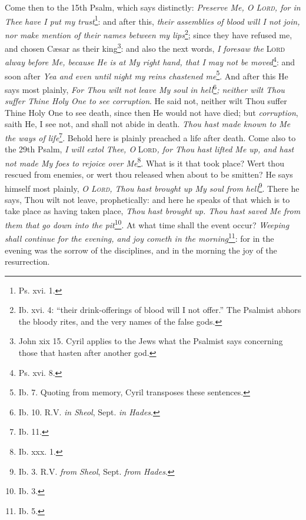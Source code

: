 Come then to the 15th Psalm, which says distinctly: \emph{Preserve Me, \textsc{O Lord}, for in Thee} \emph{have I put my trust}\footnote{Ps. xvi. 1.}: and after this, \emph{their assemblies of blood will I not join, nor make mention of their names between my lips}\footnote{Ib. xvi. 4: “their drink-offerings of blood will I not offer.” The Psalmist abhors the bloody rites, and the very names of the false gods.}; since they have refused me, and chosen Cæsar as their king\footnote{John xix 15. Cyril applies to the Jews what the Psalmist says concerning those that hasten after another god.}: and also the next words, \emph{I foresaw the} \textsc{Lord} \emph{alway before Me, because He is at My right hand, that I may not be moved}\footnote{Ps. xvi. 8.}: and soon after \emph{Yea and even until night my reins chastened me}\footnote{Ib. 7. Quoting from memory, Cyril transposes these sentences.}. And after this He says most plainly, \emph{For Thou wilt not leave My soul in hell}\footnote{Ib. 10. R.V. \emph{in Sheol}, Sept. \emph{in Hades}.}\emph{; neither wilt Thou suffer Thine Holy One to see corruption}. He said not, neither wilt Thou suffer Thine Holy One to see death, since then He would not have died; but \emph{corruption}, saith He, I see not, and shall not abide in death. \emph{Thou hast made known to Me the ways of life}\footnote{Ib. 11.}. Behold here is plainly preached a life after death. Come also to the 29th Psalm, \emph{I will extol Thee, O} \textsc{Lord}\emph{, for Thou hast lifted Me up, and hast not made My foes to rejoice over Me}\footnote{Ib. xxx. 1.}. What is it that took place? Wert thou rescued from enemies, or wert thou released when about to be smitten? He says himself most plainly, \emph{O \textsc{Lord}, Thou hast brought up My soul from hell}\footnote{Ib. 3. R.V. \emph{from Sheol}, Sept. \emph{from Hades}.}. There he says, Thou wilt not leave, prophetically: and here he speaks of that which is to take place as having taken place, \emph{Thou hast brought up. Thou hast saved Me from them that go down into the pit}\footnote{Ib. 3.}. At what time shall the event occur? \emph{Weeping shall continue for the evening, and joy cometh in the morning}\footnote{Ib. 5.}: for in the evening was the sorrow of the disciplines, and in the morning the joy of the resurrection.

